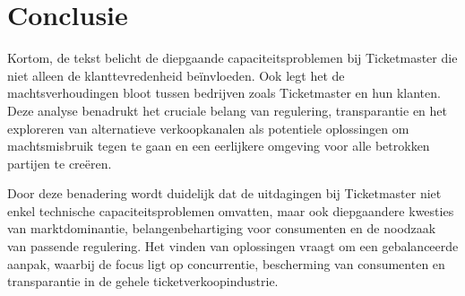 
\section{Conclusie}

Kortom, de tekst belicht de diepgaande capaciteitsproblemen bij Ticketmaster die niet alleen de klanttevredenheid beïnvloeden. Ook legt het de machtsverhoudingen bloot tussen bedrijven zoals Ticketmaster en hun klanten. Deze analyse benadrukt het cruciale belang van regulering, transparantie en het exploreren van alternatieve verkoopkanalen als potentiele oplossingen om machtsmisbruik tegen te gaan en een eerlijkere omgeving voor alle betrokken partijen te creëren.

Door deze benadering wordt duidelijk dat de uitdagingen bij Ticketmaster niet enkel technische capaciteitsproblemen omvatten, maar ook diepgaandere kwesties van marktdominantie, belangenbehartiging voor consumenten en de noodzaak van passende regulering. Het vinden van oplossingen vraagt om een gebalanceerde aanpak, waarbij de focus ligt op concurrentie, bescherming van consumenten en transparantie in de gehele ticketverkoopindustrie.
